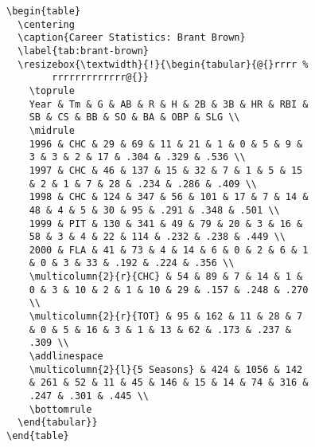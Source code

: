 \begin{verbatim}
\begin{table}
  \centering
  \caption{Career Statistics: Brant Brown}
  \label{tab:brant-brown}
  \resizebox{\textwidth}{!}{\begin{tabular}{@{}rrrr %
        rrrrrrrrrrrrr@{}}
    \toprule
    Year & Tm & G & AB & R & H & 2B & 3B & HR & RBI &
    SB & CS & BB & SO & BA & OBP & SLG \\
    \midrule
    1996 & CHC & 29 & 69 & 11 & 21 & 1 & 0 & 5 & 9 &
    3 & 3 & 2 & 17 & .304 & .329 & .536 \\
    1997 & CHC & 46 & 137 & 15 & 32 & 7 & 1 & 5 & 15
    & 2 & 1 & 7 & 28 & .234 & .286 & .409 \\
    1998 & CHC & 124 & 347 & 56 & 101 & 17 & 7 & 14 &
    48 & 4 & 5 & 30 & 95 & .291 & .348 & .501 \\
    1999 & PIT & 130 & 341 & 49 & 79 & 20 & 3 & 16 &
    58 & 3 & 4 & 22 & 114 & .232 & .238 & .449 \\
    2000 & FLA & 41 & 73 & 4 & 14 & 6 & 0 & 2 & 6 & 1
    & 0 & 3 & 33 & .192 & .224 & .356 \\
    \multicolumn{2}{r}{CHC} & 54 & 89 & 7 & 14 & 1 &
    0 & 3 & 10 & 2 & 1 & 10 & 29 & .157 & .248 & .270
    \\
    \multicolumn{2}{r}{TOT} & 95 & 162 & 11 & 28 & 7
    & 0 & 5 & 16 & 3 & 1 & 13 & 62 & .173 & .237 &
    .309 \\
    \addlinespace
    \multicolumn{2}{l}{5 Seasons} & 424 & 1056 & 142
    & 261 & 52 & 11 & 45 & 146 & 15 & 14 & 74 & 316 &
    .247 & .301 & .445 \\
    \bottomrule
  \end{tabular}}
\end{table}
\end{verbatim}

